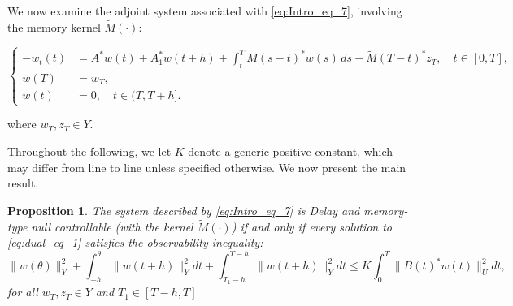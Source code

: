 \documentclass[12pt]{article}
\theoremstyle{plain}
\newtheorem{proposition}[theorem]{Proposition}
\theoremstyle{definition}
\begin{document}
We now examine the adjoint system associated with \eqref{eq:Intro_eq_7}, involving the memory kernel $\widetilde{M}(\cdot)$:\footnotemark

\begin{equation}
\label{eq:dual_eq_1}
\left\{
\begin{aligned}
    -w_t(t) &= A^* w(t) + A_1^* w(t + h) + \int_t^T M(s - t)^* w(s)\,ds - \widetilde{M}(T - t)^* z_T, \quad t \in [0, T], \\
    w(T) &= w_T, \\
    w(t) &= 0, \quad t \in (T, T + h].
\end{aligned}
\right.
\end{equation}


where $w_T, z_T \in Y$.

Throughout the following, we let $K$ denote a generic positive constant, which may differ from line to line unless specified otherwise. We now present the main result.


\begin{proposition}
\label{prop:2.1}
The system described by \eqref{eq:Intro_eq_7} is Delay and memory-type null controllable (with the kernel $\widetilde{M}(\cdot)$) if and only if every solution to \eqref{eq:dual_eq_1} satisfies the observability inequality:
\begin{equation}
\label{eq:enhanced_obs}
\|w(\theta)\|_Y^2 + \int_{ - h}^{\theta} \|w(t+h)\|_Y^2 dt+ \int_{T_1 - h}^{T-h} \|w(t+h)\|_Y^2 dt \leq K \int_0^T \|B(t)^* w(t)\|_U^2 dt,
\end{equation}
for all $w_T, z_T \in Y$ and $T_1 \in [T - h, T]$
\end{proposition}
\end{document}
